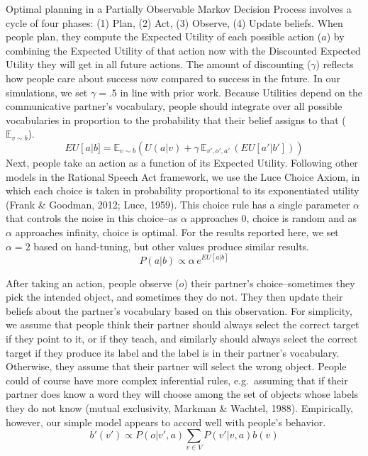 \documentclass[english,,man,floatsintext]{apa6}
\begin{document}
Optimal planning in a Partially Observable Markov Decision Process involves a cycle of four phases: (1) Plan, (2) Act, (3) Observe, (4) Update beliefs. When people plan, they compute the Expected Utility of each possible action (\(a\)) by combining the Expected Utility of that action now with the Discounted Expected Utility they will get in all future actions. The amount of discounting (\(\gamma\)) reflects how people care about success now compared to success in the future. In our simulations, we set \(\gamma=.5\) in line with prior work. Because Utilities depend on the communicative partner's vocabulary, people should integrate over all possible vocabularies in proportion to the probability that their belief assigns to that (\(\mathbb{E}_{v \sim b}\)).
\[
EU\left[a\right | b] = \mathbb{E}_{v \sim b} \left(U(a|v) + \gamma \,\mathbb{E}_{v',o',a'} \,\left( EU\left[a' | b'\right]\right)\right)
\]
Next, people take an action as a function of its Expected Utility. Following other models in the Rational Speech Act framework, we use the Luce Choice Axiom, in which each choice is taken in probability proportional to its exponentiated utility (Frank \& Goodman, 2012; Luce, 1959). This choice rule has a single parameter \(\alpha\) that controls the noise in this choice--as \(\alpha\) approaches 0, choice is random and as \(\alpha\) approaches infinity, choice is optimal. For the results reported here, we set \(\alpha = 2\) based on hand-tuning, but other values produce similar results.
\[
P\left(a|b\right) \propto \alpha \, e^{EU[a|b]}
\]

After taking an action, people observe (\(o\)) their partner's choice--sometimes they pick the intended object, and sometimes they do not. They then update their beliefs about the partner's vocabulary based on this observation. For simplicity, we assume that people think their partner should always select the correct target if they point to it, or if they teach, and similarly should always select the correct target if they produce its label and the label is in their partner's vocabulary. Otherwise, they assume that their partner will select the wrong object. People could of course have more complex inferential rules, e.g.~assuming that if their partner does know a word they will choose among the set of objects whose labels they do not know (mutual exclusivity, Markman \& Wachtel, 1988). Empirically, however, our simple model appears to accord well with people's behavior.
\[
b'(v') \propto P\left(o|v',a\right) \sum_{v \in V}P\left(v'|v,a\right)b\left(v\right)
\]
\end{document}
